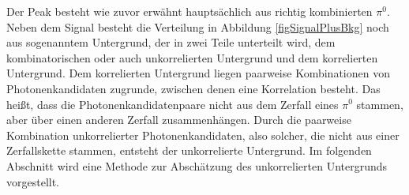 Der Peak besteht wie zuvor erwähnt hauptsächlich aus richtig kombinierten $\pi^{0}$.
Neben dem Signal besteht die Verteilung in Abbildung \ref{figSignalPlusBkg} noch aus sogenanntem Untergrund, der in zwei Teile unterteilt wird, dem kombinatorischen oder auch unkorrelierten Untergrund und dem korrelierten Untergrund.
Dem korrelierten Untergrund liegen paarweise Kombinationen von Photonenkandidaten zugrunde, zwischen denen eine Korrelation besteht.
Das heißt, dass die Photonenkandidatenpaare nicht aus dem Zerfall eines $\pi^{0}$ stammen, aber über einen anderen Zerfall zusammenhängen.
Durch die paarweise Kombination unkorrelierter Photonenkandidaten, also solcher, die nicht aus einer Zerfallskette stammen, entsteht der unkorrelierte Untergrund.
\newline
Im folgenden Abschnitt wird eine Methode zur Abschätzung des unkorrelierten Untergrunds vorgestellt. 